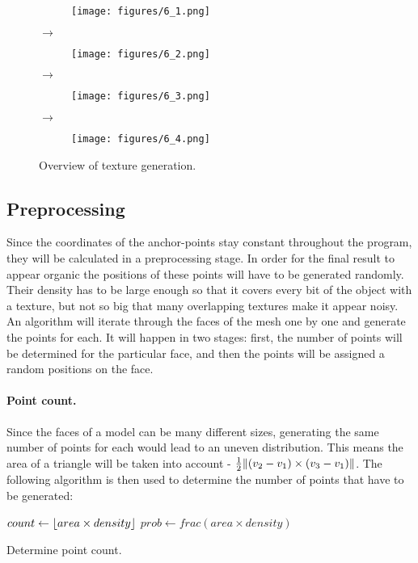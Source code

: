 \documentclass[a4paper,10pt]{article}
\DeclarePairedDelimiter{\norm}{\lVert}{\rVert}
\DeclarePairedDelimiter{\floor}{\lfloor}{\rfloor}
\begin{document}
\begin{figure}[htbp!]
  \centering
  \begin{subfigure}{0.2\columnwidth}
    \texttt{[image: figures/6\_1.png]}
  \end{subfigure}%
  $\bm{\rightarrow}$%
  \begin{subfigure}{0.2\columnwidth}
    \texttt{[image: figures/6\_2.png]}
  \end{subfigure}%
  $\bm{\rightarrow}$%
  \begin{subfigure}{0.2\columnwidth}
    \texttt{[image: figures/6\_3.png]}
  \end{subfigure}%
  $\bm{\rightarrow}$%
  \begin{subfigure}{0.2\columnwidth}
    \texttt{[image: figures/6\_4.png]}
  \end{subfigure}
  \caption{Overview of texture generation.}
\end{figure}


\subsection{Preprocessing}
Since the coordinates of the anchor-points stay constant throughout the program, they will be calculated in a preprocessing stage. In order for the final result to appear organic the positions of these points will have to be generated randomly. Their density has to be large enough so that it covers every bit of the object with a texture, but not so big that many overlapping textures make it appear noisy. An algorithm will iterate through the faces of the mesh one by one and generate the points for each. It will happen in two stages: first, the number of points will be determined for the particular face, and then the points will be assigned a random positions on the face.

\paragraph{Point count.}
Since the faces of a model can be many different sizes, generating the same number of points for each would lead to an uneven distribution. This means the area of a triangle will be taken into account - $\frac{1}{2}\norm{(v_2-v_1) \times (v_3-v_1)}$. The following algorithm is then used to determine the number of points that have to be generated:

\begin{algorithm}[H]
  $count \leftarrow \floor{area \times density}$\;
  $prob \leftarrow frac(area \times density)$ 
  \caption{Determine point count.}
\end{algorithm}
\end{document}
